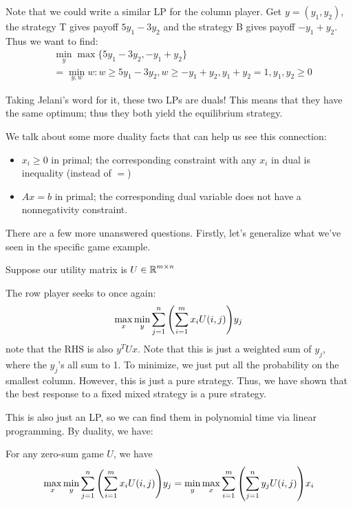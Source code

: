 \begin{example}
    Note that we could write a similar LP for the column player. Get $y = (y_1, y_2)$, the strategy T gives payoff $5y_1 - 3y_2$ and
    the strategy B gives payoff $-y_1 + y_2$. Thus we want to find:
    \begin{align*}
        &\min_y \max\{5y_1 - 3y_2, -y_1 + y_2\} \\
        &= \min_{y, w} w: w \geq 5y_1 - 3y_2, w \geq -y_1 + y_2, y_1 + y_2 = 1, y_1, y_2 \geq 0
    \end{align*}

    Taking Jelani's word for it, these two LPs are duals! This means that they have the same optimum; thus they both yield the equilibrium strategy.
\end{example}

We talk about some more duality facts that can help us see this connection:
\begin{itemize}
    \item $x_i \geq 0$ in primal; the corresponding constraint with any $x_i$ in dual is inequality (instead of $=$)
    \item $Ax = b$ in primal; the corresponding dual variable does not have a nonnegativity constraint.
\end{itemize}

There are a few more unanswered questions. Firstly, let's generalize what we've seen in the specific game example.

Suppose our utility matrix is $U \in \operatorname{\mathbb{R}}^{m \times n}$

The row player seeks to once again:
\[ \max_x \min_y \sum_{j = 1}^n\qty(\sum_{i = 1}^m x_i U(i, j)) y_j \]
note that the RHS is also $y^T U x$. Note that this is just a weighted sum of $y_j$, where the $y_j$'s all sum to 1. To minimize,
we just put all the probability on the smallest column. However, this is just a pure strategy. Thus, we have shown that the best response to
a fixed mixed strategy is a pure strategy.

This is also just an LP, so we can find them in polynomial time via linear programming. By duality, we have:

\begin{theorem}
    For any zero-sum game $U$, we have
    \[ \max_x \min_y \sum_{j = 1}^n\qty(\sum_{i = 1}^m x_i U(i, j)) y_j = \min_y \max_x \sum_{i = 1}^m\qty(\sum_{j = 1}^n y_j U(i, j)) x_i \]
\end{theorem}
